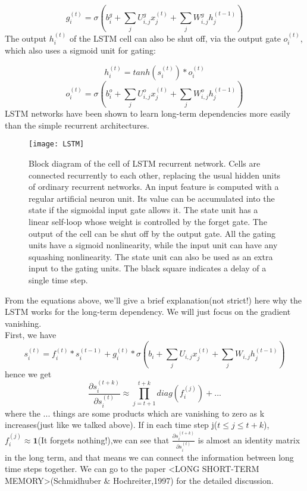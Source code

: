 \begin{equation}
g_i^{(t)} = \sigma(b_i^g + \sum_jU_{i,j}^gx_j^{(t)} + \sum_jW_{i,j}^gh_j^{(t-1)})
\end{equation}The output $h_i^{(t)}$ of the LSTM cell can also be shut off, via the output gate $o_i^{(t)}$, which also uses a sigmoid unit for gating:

\begin{equation}
h_i^{(t)} = tanh(s_i^{(t)}) \ast o_i^{(t)}
\end{equation}
\begin{equation}
o_i^{(t)} = \sigma(b_i^o + \sum_jU_{i,j}^ox_j^{(t)} + \sum_jW_{i,j}^oh_j^{(t-1)})
\end{equation}
LSTM networks have been shown to learn long-term dependencies more easily than the simple recurrent architectures.
\begin{figure}[H]
	\centering
	\texttt{[image: LSTM]}
	\caption{Block diagram of the cell of LSTM recurrent network. Cells are connected recurrently to each other, replacing the usual hidden units of ordinary recurrent networks. An input feature is computed with a regular artificial neuron unit. Its value can be accumulated into the state if the sigmoidal input gate allows it. The state unit has a linear self-loop whose weight is controlled by the forget gate. The output of the cell can be shut off by the output gate. All the gating units have a sigmoid nonlinearity, while the input unit can have any squashing nonlinearity. The state unit can also be used as an extra input to the gating units. The black square indicates a delay of a single time step.}
\end{figure}
From the equations above, we'll give a brief explanation(not strict!) here why the LSTM works for the long-term dependency. We will just focus on the gradient vanishing. \\
First, we have 
\begin{equation}
s_i^{(t)} = f_i^{(t)} \ast s_i^{(t-1)} + g_i^{(t)} \ast \sigma(b_i + \sum_jU_{i,j}x_j^{(t)} + \sum_jW_{i,j}h_j^{(t-1)})
\end{equation}
hence we get
\begin{equation}
\frac{\partial s_i^{(t+k)}}{\partial s_i^{(t)}} \approx \prod_{j=t+1}^{t+k} diag(f_i^{(j)}) + ...
\end{equation}
where the $...$ things are some products which are vanishing to zero as k increases(just like we talked above). If in each time step j($t \le j \le t+k$), $f_i^{(j)} \approx \textbf{1}$(It forgets nothing!),we can see that $\frac{\partial s_i^{(t+k)}}{\partial s_i^{(t)}}$ is almost an identity matrix in the long term, and that means we can connect the information between long time steps together. We can go to the paper <LONG SHORT-TERM MEMORY>(Schmidhuber $\&$ Hochreiter,1997) for the detailed discussion.
